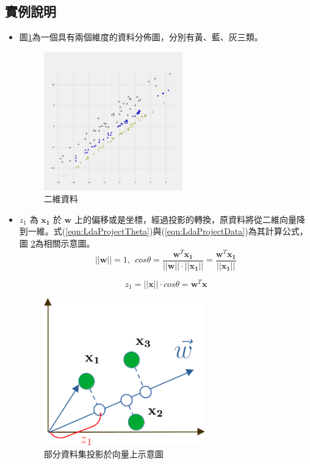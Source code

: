 \subsection{實例說明}
\begin{itemize}
	\item
	      圖\ref{fig:LdaDemostrate}為一個具有兩個維度的資料分佈圖，分別有黃、藍、灰三類。
	      \begin{figure}[h]
		      \centering
		      \includegraphics[width=6cm]{pic/lda_dataset.png}
		      \caption{二維資料}
		      \label{fig:LdaDemostrate}
	      \end{figure}

	\item
		\(z_1\) 為 \(\mathbf{x_1}\) 於 \(\mathbf{w}\) 上的偏移或是坐標，經過投影的轉換，原資料將從二維向量降到一維。式(\ref{eqn:LdaProjectTheta})與(\ref{eqn:LdaProjectData})為其計算公式，圖 \ref{fig:LdaVectorProject}為相關示意圖。
		      \begin{equation}
		      \label{eqn:LdaProjectTheta}
				  ||\mathbf{w}|| = 1, \ \ cos \theta  = \frac{\mathbf{w}^T\mathbf{x_1}}{||\mathbf{w}|| \cdot ||\mathbf{x_1}||}= \frac{\mathbf{w}^T\mathbf{x_1}}{||\mathbf{x_1}||}
		      \end{equation}

		      \begin{equation}
		      \label{eqn:LdaProjectData}
			  z_1 =  ||\mathbf{x}|| \cdot cos \theta = \mathbf{w}^T\mathbf{x}
		      \end{equation}

	      \begin{figure}[H]
		      \begin{center}
			      \includegraphics[width=7cm]{./pic/24yBU055.png}
			      \caption{部分資料集投影於向量上示意圖}
			      \label{fig:LdaVectorProject}
		      \end{center}
	      \end{figure}



\end{itemize}
